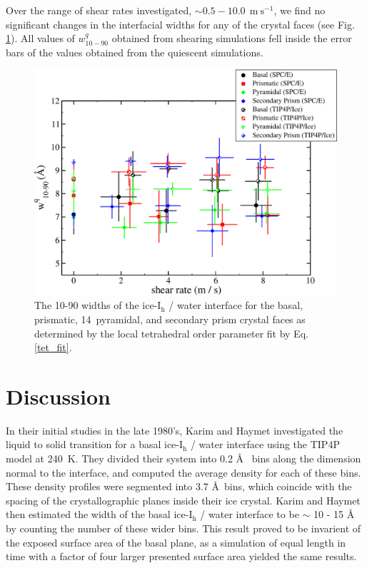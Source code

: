 Over the range of shear rates investigated,
$\sim 0.5-10.0~\mathrm{~m~s}^{-1}$, we find no significant changes in
the interfacial widths for any of the crystal faces (see Fig. \ref{fig:tetByShearRate}). All values of
$w_\mathrm{10-90}^{q}$ obtained from shearing simulations fell inside the
error bars of the values obtained from the quiescent simulations.

\begin{figure}[H]
\includegraphics[width=\linewidth]{Figures/tetByShearRate}
\caption{\label{fig:tetByShearRate}The 10-90 widths of the
  ice-I$_\mathrm{h}$ / water interface for the basal, prismatic,
  14\degree~pyramidal, and secondary prism crystal faces as determined
  by the local tetrahedral order parameter fit by
  Eq. \eqref{tet_fit}.}
\end{figure}


\section{Discussion}
In their initial studies in the late 1980's, Karim and Haymet
investigated the liquid to solid transition for a basal
ice-I$_\mathrm{h}$ / water interface using the TIP4P model at
240~K.\cite{Karim1987,Karim1988} They divided their system into 0.2
\AA~ bins along the dimension normal to the interface, and computed
the average density for each of these bins. These density profiles
were segmented into 3.7 \AA~bins, which coincide with the spacing of
the crystallographic planes inside their ice crystal. Karim and Haymet
then estimated the width of the basal ice-I$_\mathrm{h}$ / water
interface to be $\sim$ 10 - 15 \AA~ by counting the number of these
wider bins. This result proved to be invarient of the exposed surface
area of the basal plane, as a simulation of equal length in time with
a factor of four larger presented surface area yielded the same
results.

